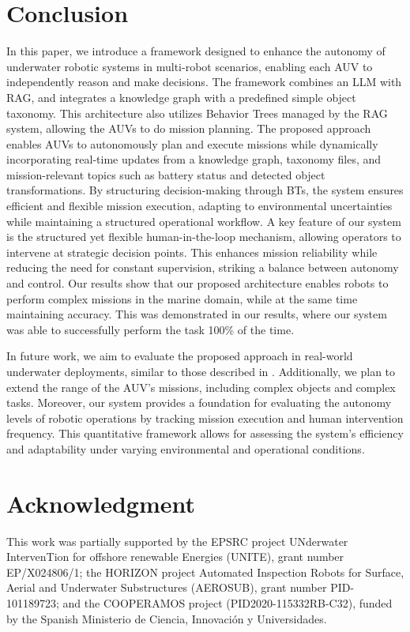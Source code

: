 \documentclass[journal]{IEEEtran}
\begin{document}
\section{Conclusion}
In this paper, we introduce a framework designed to enhance the autonomy of underwater robotic systems in multi-robot scenarios, enabling each AUV to independently reason and make decisions. The framework combines an LLM with RAG, and integrates a knowledge graph with a predefined simple object taxonomy. This architecture also utilizes Behavior Trees managed by the RAG system, allowing the AUVs to do mission planning. The proposed approach enables AUVs to autonomously plan and execute missions while dynamically incorporating real-time updates from a knowledge graph, taxonomy files, and mission-relevant topics such as battery status and detected object transformations. By structuring decision-making through BTs, the system ensures efficient and flexible mission execution, adapting to environmental uncertainties while maintaining a structured operational workflow. A key feature of our system is the structured yet flexible human-in-the-loop mechanism, allowing operators to intervene at strategic decision points. This enhances mission reliability while reducing the need for constant supervision, striking a balance between autonomy and control. Our results show that our proposed architecture enables robots to perform complex missions in the marine domain, while at the same time maintaining accuracy. This was demonstrated in our results, where our system was able to successfully perform the task 100\% of the time.  


In future work, we aim to evaluate the proposed approach in real-world underwater deployments, similar to those described in \cite{6942870}. Additionally, we plan to extend the range of the AUV's missions, including complex objects and complex tasks.
Moreover, our system provides a foundation for evaluating the autonomy levels of robotic operations by tracking mission execution and human intervention frequency. This quantitative framework allows for assessing the system's efficiency and adaptability under varying environmental and operational conditions.


\section*{Acknowledgment}

This work was partially supported by the EPSRC project UNderwater IntervenTion for offshore renewable Energies (UNITE), grant number EP/X024806/1; the HORIZON project Automated Inspection Robots for Surface, Aerial and Underwater Substructures (AEROSUB), grant number PID-101189723; and the COOPERAMOS project (PID2020-115332RB-C32), funded by the Spanish Ministerio de Ciencia, Innovación y Universidades.



\end{document}
